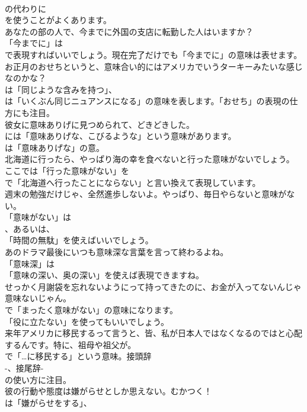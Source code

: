 \documentclass[8pt]{extreport}
\begin{document}
\begin{CJK}{UTF8}{min}
\\	の代わりに
\\	を使うことがよくあります。	
\\	あなたの部の人で、今までに外国の支店に転勤した人はいますか？ 
\\	「今までに」は 
\\	で表現すればいいでしょう。現在完了だけでも「今までに」の意味は表せます。	
\\	お正月のおせちというと、意味合い的にはアメリカでいうターキーみたいな感じなのかな？ 
\\	は「同じような含みを持つ」、
\\	は「いくぶん同じニュアンスになる」の意味を表します。「おせち」の表現の仕方にも注目。	
\\	彼女に意味ありげに見つめられて、どきどきした。 
\\	には「意味ありげな、こびるような」という意味があります。
\\	は「意味ありげな」の意。	
\\	北海道に行ったら、やっぱり海の幸を食べないと行った意味がないでしょう。 
\\	ここでは「行った意味がない」を
\\	で「北海道へ行ったことにならない」と言い換えて表現しています。	
\\	週末の勉強だけじゃ、全然進歩しないよ。やっぱり、毎日やらないと意味がない。 
\\	「意味がない」は
\\	、あるいは、
\\	「時間の無駄」を使えばいいでしょう。	
\\	あのドラマ最後にいつも意味深な言葉を言って終わるよね。 
\\	「意味深」は
\\	「意味の深い、奥の深い」を使えば表現できますね。	
\\	せっかく月謝袋を忘れないようにって持ってきたのに、お金が入ってないんじゃ意味ないじゃん。 
\\	で「まったく意味がない」の意味になります。
\\	「役に立たない」を使ってもいいでしょう。	
\\	来年アメリカに移民するって言うと、皆、私が日本人ではなくなるのではと心配するんです。特に、祖母や祖父が。 
\\	で「…に移民する」という意味。接頭辞 
\\	-、接尾辞-
\\	の使い方に注目。	
\\	彼の行動や態度は嫌がらせとしか思えない。むかつく！ 
\\	は「嫌がらせをする」、

\end{CJK}
\end{document}
